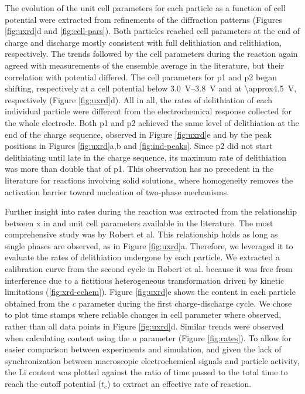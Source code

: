 \documentclass{article}
\begin{document}
The evolution of the unit cell parameters for each particle  as a function of cell
potential were extracted from refinements of the diffraction
patterns (Figures \ref{fig:uxrd}d and
\ref{fig:cell-pars}). Both particles reached cell parameters at the end of charge and discharge mostly consistent with full delithiation and relithiation, respectively.\cite{novak2015} The trends followed by the cell parameters during the reaction again agreed  with measurements of the ensemble average in the literature\cite{novak2015}, but their correlation with potential differed. The
cell parameters for \gls{p1} and \gls{p2} began shifting, respectively at a cell potential
below \SIrange{3.0}{3.8}{\volt} and at \SI{\approx4.5}{\volt}, respectively (Figure
\ref{fig:uxrd}d). All in all, the rates of delithiation of each
individual particle were different from the
electrochemical response collected for the whole electrode. Both \gls{p1} and \gls{p2} achieved the same level of delithiation at
the end of the charge sequence, observed in Figure \ref{fig:uxrd}e and
by the peak positions in Figures \ref{fig:uxrd}a,b and
\ref{fig:ind-peaks}. Since \gls{p2} did not start delithiating until
late in the charge sequence, its maximum rate of delithiation was more
than double that of \gls{p1}. This observation has no precedent in the
literature for reactions involving solid solutions, where homogeneity
removes the activation barrier toward nucleation of two-phase
mechanisms. 


Further insight into rates during the reaction was extracted from the relationship between x in  and unit cell parameters available in the literature. The most comprehensive study was by Robert et al.\cite{robert2015} This relationship holds as long as single phases are observed, as in Figure \ref{fig:uxrd}a. Therefore, we leveraged it to evaluate the rates of delithiation undergone by each particle. We
extracted a calibration curve from the second cycle in Robert et al.\cite{robert2015} because it was free from interference due to a fictitious heterogeneous transformation driven by kinetic limitations (\ref{fig:xrd-echem}). Figure \ref{fig:uxrd}e shows the  content in each  particle obtained from the \emph{c} parameter during the first charge-discharge cycle. We chose to plot time stamps where reliable changes in cell parameter where observed, rather than all data points in Figure \ref{fig:uxrd}d. Similar trends were observed
when calculating  content using the \emph{a} parameter (Figure
\ref{fig:rates}). To allow for easier comparison between experiments
and simulation, and given the lack of synchronization between macroscopic electrochemical signals and particle activity, the Li content was plotted against the ratio of time passed to the
total time to reach the cutoff potential ($t_c$) to extract an effective rate of reaction. 
\end{document}

